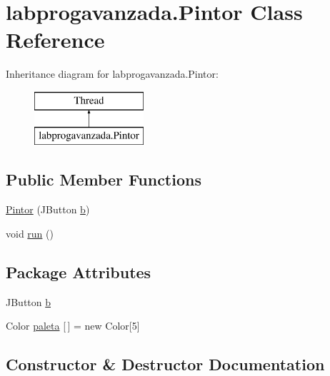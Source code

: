\hypertarget{classlabprogavanzada_1_1_pintor}{}\section{labprogavanzada.\+Pintor Class Reference}
\label{classlabprogavanzada_1_1_pintor}
Inheritance diagram for labprogavanzada.\+Pintor\+:\begin{figure}[H]
\begin{center}
\leavevmode
\includegraphics[height=2.000000cm]{classlabprogavanzada_1_1_pintor}
\end{center}
\end{figure}
\subsection*{Public Member Functions}
\begin{DoxyCompactItemize}
\item 
\mbox{\hyperlink{classlabprogavanzada_1_1_pintor_ac860bb13dfb9a119752fcfde4c7322f8}{Pintor}} (J\+Button \mbox{\hyperlink{classlabprogavanzada_1_1_pintor_a171f3004a9b9e99f64e81de4c1257d6f}{b}})
\item 
void \mbox{\hyperlink{classlabprogavanzada_1_1_pintor_a8bf856de5794d5fd6efe70f3b04802a0}{run}} ()
\end{DoxyCompactItemize}
\subsection*{Package Attributes}
\begin{DoxyCompactItemize}
\item 
J\+Button \mbox{\hyperlink{classlabprogavanzada_1_1_pintor_a171f3004a9b9e99f64e81de4c1257d6f}{b}}
\item 
Color \mbox{\hyperlink{classlabprogavanzada_1_1_pintor_aa726e5f94f03e7e1ee20eb9995e368e5}{paleta}} \mbox{[}$\,$\mbox{]} = new Color\mbox{[}5\mbox{]}
\end{DoxyCompactItemize}


\subsection{Constructor \& Destructor Documentation}
\mbox{\label{classlabprogavanzada_1_1_pintor_ac860bb13dfb9a119752fcfde4c7322f8}} 
